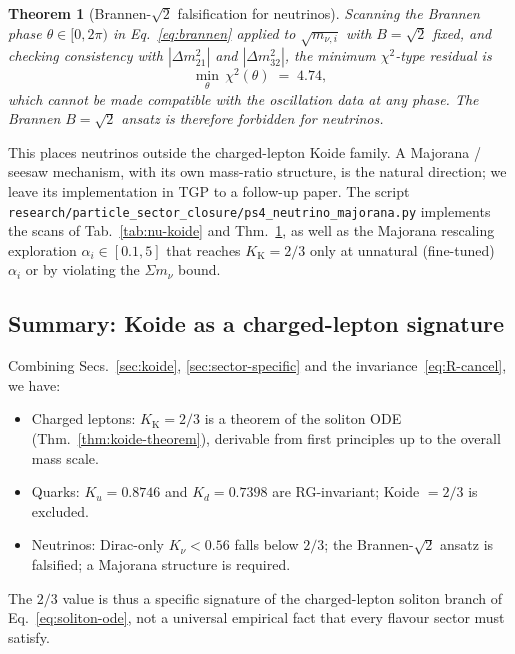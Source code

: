 \documentclass[11pt,a4paper]{article}
\newcommand{\Kkoide}{K_{\mathrm{K}}}
\newtheorem{theorem}{Theorem}
\begin{document}
\begin{theorem}[Brannen-$\sqrt{2}$ falsification for neutrinos]\label{thm:brannen-nu}
Scanning the Brannen phase $\theta\in[0,2\pi)$ in
Eq.~\eqref{eq:brannen} applied to $\sqrt{m_{\nu,i}}$ with $B=\sqrt{2}$
fixed, and checking consistency with $|\Delta m^{2}_{21}|$ and
$|\Delta m^{2}_{32}|$, the minimum $\chi^{2}$-type residual is
\begin{equation}
  \min_{\theta}\,\chi^{2}(\theta) \;=\; 4.74,
\end{equation}
which \emph{cannot} be made compatible with the oscillation data at
any phase. The Brannen $B=\sqrt{2}$ ansatz is therefore \emph{forbidden}
for neutrinos.
\end{theorem}

\noindent
This places neutrinos outside the charged-lepton Koide family. A
Majorana / seesaw mechanism, with its own mass-ratio structure, is the
natural direction; we leave its implementation in TGP to a follow-up
paper. The script
\verb|research/particle_sector_closure/ps4_neutrino_majorana.py|
implements the scans of Tab.~\ref{tab:nu-koide} and
Thm.~\ref{thm:brannen-nu}, as well as the Majorana rescaling exploration
$\alpha_{i}\in[0.1,5]$ that reaches $\Kkoide=2/3$ only at unnatural
(fine-tuned) $\alpha_{i}$ or by violating the $\Sigma m_{\nu}$ bound.

\subsection{Summary: Koide as a charged-lepton signature}

Combining Secs.~\ref{sec:koide}, \ref{sec:sector-specific} and the
invariance~\eqref{eq:R-cancel}, we have:
\begin{itemize}[leftmargin=1.4em,nosep]
\item Charged leptons: $\Kkoide=2/3$ is a theorem of the soliton ODE
(Thm.~\ref{thm:koide-theorem}), derivable from first principles up to
the overall mass scale.
\item Quarks: $K_{u}=0.8746$ and $K_{d}=0.7398$ are RG-invariant;
Koide $=2/3$ is excluded.
\item Neutrinos: Dirac-only $K_{\nu}<0.56$ falls below $2/3$; the
Brannen-$\sqrt{2}$ ansatz is falsified; a Majorana structure is
required.
\end{itemize}
The $2/3$ value is thus a specific signature of the charged-lepton
soliton branch of Eq.~\eqref{eq:soliton-ode}, not a universal empirical
fact that every flavour sector must satisfy.
\end{document}
